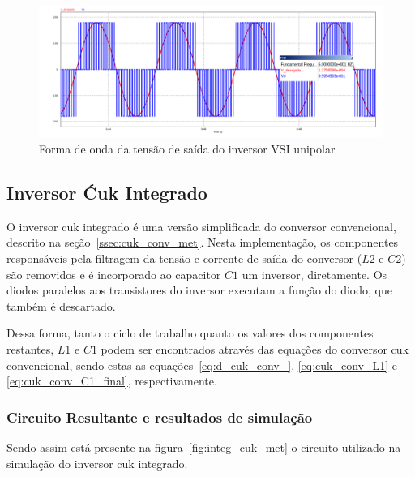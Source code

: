 \documentclass[
	12pt,				%
	openany,
	onseside,
	a4paper,			%
	english,			%
	french,				%
	spanish,			%
	brazil,				%
	]{abntex2}
\begin{document}
\begin{figure}[H]%
	\centering
		\includegraphics[width= \linewidth]{vsi_uni_out}
		\caption{Forma de onda da tensão de saída do inversor VSI unipolar}
		\label{fig:response_vsi_uni}
\end{figure}

\subsection{Inversor Ćuk Integrado}

O inversor cuk integrado é uma versão simplificada do conversor convencional, descrito na seção~\ref{ssec:cuk_conv_met}. Nesta implementação, os componentes responsáveis pela filtragem da tensão e corrente de saída do conversor ($L2$ e $C2$) são removidos e é incorporado ao capacitor $C1$ um inversor, diretamente. Os diodos paralelos aos transistores do inversor executam a função do diodo, que também é descartado.

Dessa forma, tanto o ciclo de trabalho quanto os valores dos componentes restantes, $L1$ e $C1$ podem ser encontrados através das equações do conversor cuk convencional, sendo estas as equações~\ref{eq:d_cuk_conv_}, \ref{eq:cuk_conv_L1} e \ref{eq:cuk_conv_C1_final}, respectivamente.

\subsubsection{Circuito Resultante e resultados de simulação}

Sendo assim está presente na figura~\ref{fig:integ_cuk_met} o circuito utilizado na simulação do inversor cuk integrado.
\end{document}
